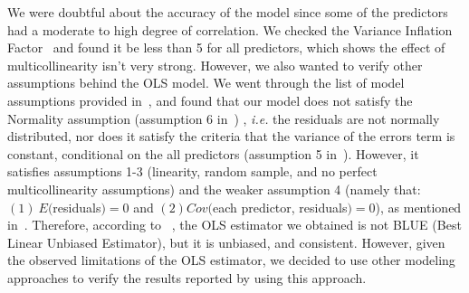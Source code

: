 \documentclass[smallcondensed]{svjour3}     %
\begin{document}
We were doubtful about the accuracy of the model since some of the predictors had a moderate to high degree of correlation. We checked the Variance Inflation Factor~\cite{menard1995applied} and found it be less than 5 for all predictors, which shows the effect of multicollinearity isn't very strong. However, we also wanted to verify other assumptions behind the OLS model. We went through the list of model assumptions provided in~\cite{ols}, and found that our model does not satisfy the Normality assumption (assumption 6 in~\cite{ols}) , \emph{i.e.} the residuals are not normally distributed, nor does it satisfy the criteria that the variance of the errors term is constant, conditional on the all predictors (assumption 5 in~\cite{ols}). However, it satisfies assumptions 1-3 (linearity, random sample, and no perfect multicollinearity  assumptions) and the weaker assumption 4 (namely that: $(1)\ E($residuals$) = 0$ and $(2) Cov($each predictor, residuals$) = 0$), as mentioned in~\cite{ols}. Therefore, according to ~\cite{ols}, the OLS estimator we obtained is not BLUE (Best Linear Unbiased Estimator), but it is unbiased, and consistent. However, given the observed limitations of the OLS estimator, we decided to use other modeling approaches to verify the results reported by using this approach.


\begin{table}[ht]
\caption{Summary Result of LR model for ``Exceptions"}\label{t:LR1}
\centering
{}
\vspace{-20pt}
\end{table}
\end{document}

